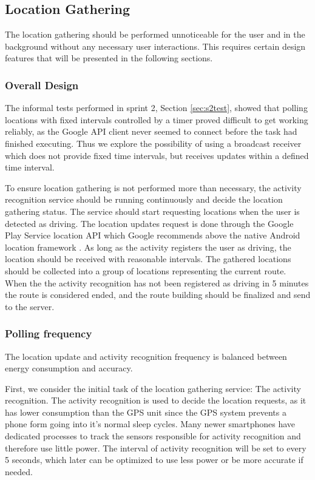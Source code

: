 \subsection{Location Gathering}\label{section:s3locgath}
The location gathering should be performed unnoticeable for the user and in the background without any necessary user interactions. 
This requires certain design features that will be presented in the following sections. 


\subsubsection{Overall Design}
The informal tests performed in sprint 2, Section \ref{sec:s2test}, showed that polling locations with fixed intervals controlled by a timer proved difficult to get working reliably, as the Google API client never seemed to connect before the task had finished executing. 
Thus we explore the possibility of using a broadcast receiver which does not provide fixed time intervals, but receives updates within a defined time interval.

To ensure location gathering is not performed more than necessary, the activity recognition service should be running continuously and decide the location gathering status.
The service should start requesting locations when the user is detected as driving. 
The location updates request is done through the Google Play Service location API which Google recommends above the native Android location framework \cite{apploc}.
As long as the activity registers the user as driving, the location should be received with reasonable intervals.
The gathered locations should be collected into a group of locations representing the current route.
When the the activity recognition has not been registered as driving in 5 minutes the route is considered ended, and the route building should be finalized and send to the server.

\subsubsection{Polling frequency}
The location update and activity recognition frequency is balanced between energy consumption and accuracy.

First, we consider the initial task of the location gathering service: The activity recognition.
The activity recognition is used to decide the location requests, as it has lower consumption than the GPS unit \cite{fuckGPS} since the GPS system prevents a phone form going into it's normal sleep cycles.
Many newer smartphones \cite{coCPU} have dedicated processes to track the sensors responsible for activity recognition and therefore use little power.
The interval of activity recognition will be set to every 5 seconds, which later can be optimized to use less power or be more accurate if needed.


